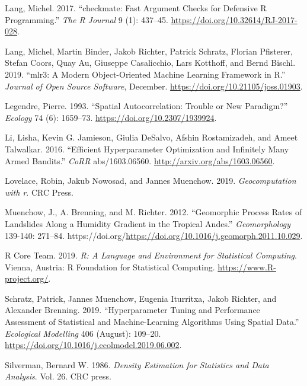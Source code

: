 \documentclass[
]{scrbook}
\newlength{\cslhangindent}
\newlength{\cslentryspacingunit} %
\newenvironment{CSLReferences}[2] %
 {%
  \setlength{\parindent}{0pt}
  \ifodd #1
  \let\oldpar\par
  \def\par{\hangindent=\cslhangindent\oldpar}
  \fi
  \setlength{\parskip}{#2\cslentryspacingunit}
 }%
 {}
\begin{document}
\begin{CSLReferences}{1}{0}
\leavevmode{}%
Lang, Michel. 2017. {``{checkmate: Fast Argument Checks for Defensive R Programming}.''} \emph{{The R Journal}} 9 (1): 437--45. \url{https://doi.org/10.32614/RJ-2017-028}.

\leavevmode{}%
Lang, Michel, Martin Binder, Jakob Richter, Patrick Schratz, Florian Pfisterer, Stefan Coors, Quay Au, Giuseppe Casalicchio, Lars Kotthoff, and Bernd Bischl. 2019. {``{mlr3}: A Modern Object-Oriented Machine Learning Framework in {R}.''} \emph{Journal of Open Source Software}, December. \url{https://doi.org/10.21105/joss.01903}.

\leavevmode{}%
Legendre, Pierre. 1993. {``Spatial Autocorrelation: Trouble or New Paradigm?''} \emph{Ecology} 74 (6): 1659--73. \url{https://doi.org/10.2307/1939924}.

\leavevmode{}%
Li, Lisha, Kevin G. Jamieson, Giulia DeSalvo, Afshin Rostamizadeh, and Ameet Talwalkar. 2016. {``Efficient Hyperparameter Optimization and Infinitely Many Armed Bandits.''} \emph{CoRR} abs/1603.06560. \url{http://arxiv.org/abs/1603.06560}.

\leavevmode{}%
Lovelace, Robin, Jakub Nowosad, and Jannes Muenchow. 2019. \emph{Geocomputation with r}. CRC Press.

\leavevmode{}%
Muenchow, J., A. Brenning, and M. Richter. 2012. {``Geomorphic Process Rates of Landslides Along a Humidity Gradient in the Tropical Andes.''} \emph{Geomorphology} 139-140: 271--84. https://doi.org/\url{https://doi.org/10.1016/j.geomorph.2011.10.029}.

\leavevmode{}%
R Core Team. 2019. \emph{R: A Language and Environment for Statistical Computing}. Vienna, Austria: R Foundation for Statistical Computing. \url{https://www.R-project.org/}.

\leavevmode{}%
Schratz, Patrick, Jannes Muenchow, Eugenia Iturritxa, Jakob Richter, and Alexander Brenning. 2019. {``Hyperparameter Tuning and Performance Assessment of Statistical and Machine-Learning Algorithms Using Spatial Data.''} \emph{Ecological Modelling} 406 (August): 109--20. \url{https://doi.org/10.1016/j.ecolmodel.2019.06.002}.

\leavevmode{}%
Silverman, Bernard W. 1986. \emph{Density Estimation for Statistics and Data Analysis}. Vol. 26. CRC press.


\end{CSLReferences}
\end{document}
